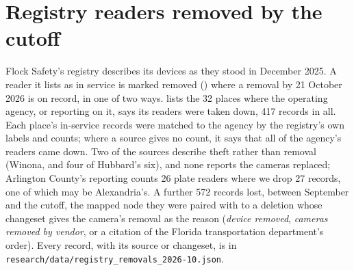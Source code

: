\documentclass[11pt,twoside]{article}
\begin{document}



\appendix

\section{Registry readers removed by the cutoff}
\label{app:removals}

Flock Safety's registry describes its devices as they stood in December 2025. A reader it lists
as in service is marked removed () where a removal by 21 October 2026 is
on record, in one of two ways.  lists the 32 places where the operating agency,
or reporting on it, says its readers were taken down, \num{417} records in all. Each place's
in-service records were matched to the agency by the registry's own labels and counts; where a
source gives no count, it says that all of the agency's readers came down. Two of the sources
describe theft rather than removal (Winona, and four of Hubbard's six), and none reports the
cameras replaced; Arlington County's reporting counts 26 plate readers where we drop 27 records,
one of which may be Alexandria's. A further \num{572} records lost, between September and
the cutoff, the mapped node they were paired with to a deletion whose changeset gives the
camera's removal as the reason (\emph{device removed}, \emph{cameras removed by vendor}, or a
citation of the Florida transportation department's order). Every record, with its source or
changeset, is in \texttt{research/data/\allowbreak registry\_removals\_2026-10.json}.
\end{document}
